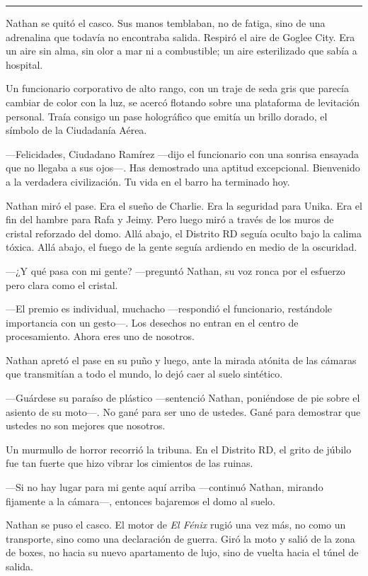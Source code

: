 \documentclass[12pt,a4paper]{book}
\begin{document}
\bigskip
\noindent\rule{\textwidth}{0.4pt}
\bigskip

Nathan se quitó el casco. Sus manos temblaban, no de fatiga, sino de una adrenalina que todavía no encontraba salida. Respiró el aire de Goglee City. Era un aire sin alma, sin olor a mar ni a combustible; un aire esterilizado que sabía a hospital.

Un funcionario corporativo de alto rango, con un traje de seda gris que parecía cambiar de color con la luz, se acercó flotando sobre una plataforma de levitación personal. Traía consigo un pase holográfico que emitía un brillo dorado, el símbolo de la Ciudadanía Aérea.

---Felicidades, Ciudadano Ramírez ---dijo el funcionario con una sonrisa ensayada que no llegaba a sus ojos---. Has demostrado una aptitud excepcional. Bienvenido a la verdadera civilización. Tu vida en el barro ha terminado hoy.

Nathan miró el pase. Era el sueño de Charlie. Era la seguridad para Unika. Era el fin del hambre para Rafa y Jeimy. Pero luego miró a través de los muros de cristal reforzado del domo. Allá abajo, el Distrito RD seguía oculto bajo la calima tóxica. Allá abajo, el fuego de la gente seguía ardiendo en medio de la oscuridad.

---¿Y qué pasa con mi gente? ---preguntó Nathan, su voz ronca por el esfuerzo pero clara como el cristal.

---El premio es individual, muchacho ---respondió el funcionario, restándole importancia con un gesto---. Los desechos no entran en el centro de procesamiento. Ahora eres uno de nosotros.

Nathan apretó el pase en su puño y luego, ante la mirada atónita de las cámaras que transmitían a todo el mundo, lo dejó caer al suelo sintético.

---Guárdese su paraíso de plástico ---sentenció Nathan, poniéndose de pie sobre el asiento de su moto---. No gané para ser uno de ustedes. Gané para demostrar que ustedes no son mejores que nosotros.

Un murmullo de horror recorrió la tribuna. En el Distrito RD, el grito de júbilo fue tan fuerte que hizo vibrar los cimientos de las ruinas.

---Si no hay lugar para mi gente aquí arriba ---continuó Nathan, mirando fijamente a la cámara---, entonces bajaremos el domo al suelo.

Nathan se puso el casco. El motor de \textit{El Fénix} rugió una vez más, no como un transporte, sino como una declaración de guerra. Giró la moto y salió de la zona de boxes, no hacia su nuevo apartamento de lujo, sino de vuelta hacia el túnel de salida.
\end{document}
